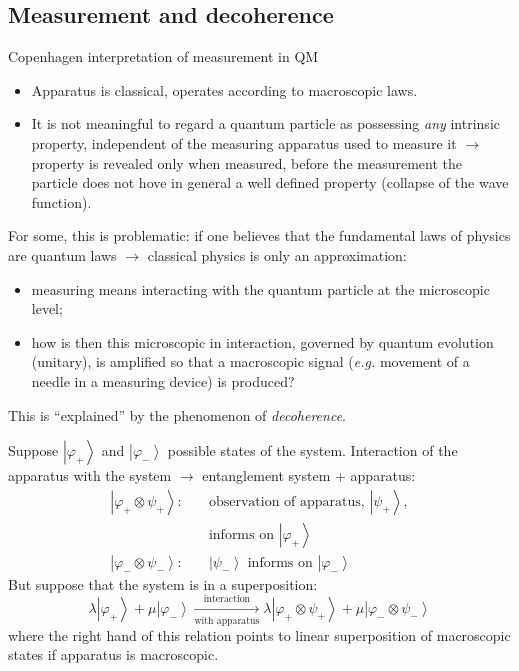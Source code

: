 \documentclass[12pt]{article}
\begin{document}
\subsection{Measurement and decoherence}

Copenhagen interpretation of measurement in QM
\begin{itemize}
\item Apparatus is classical, operates according to
macroscopic laws.
\item It is not meaningful to regard a quantum
particle as possessing \emph{any} intrinsic property,
independent of the measuring apparatus used
to measure it $\rightarrow$ property is revealed only
when measured, before the measurement the
particle does not hove in general a well defined
property (collapse of the wave function).
\end{itemize}


For some, this is problematic: if one believes that
the fundamental laws of physics are quantum laws
$\rightarrow$ classical physics is only an approximation:
\begin{itemize}
\item measuring means interacting with the quantum
particle at the microscopic level;
\item how is then this microscopic in interaction,
governed by quantum evolution (unitary), is
amplified so that a macroscopic signal
(\emph{e.g.} movement of a needle in a measuring
device) is produced?
\end{itemize}
This is ``explained'' by the phenomenon of \emph{decoherence}.

Suppose \(\left|\varphi_{+}\right\rangle\) and \(\left|\varphi_{-}\right\rangle\) possible states of the system.
Interaction of the apparatus with the system \(\rightarrow\) entanglement
system + apparatus:
\[
\begin{aligned}
\left|\varphi_{+} \otimes \psi_{+}\right\rangle:\quad
&\text {observation of apparatus, }\left|\psi_{+}\right\rangle, \\ 
&\text {informs on }\left|\varphi_{+}\right\rangle \\ 
\left|\varphi_{-} \otimes \psi_{-}\right\rangle:\quad 
&\left|\psi_{-}\right\rangle \text { informs on }\left|\varphi_{-}\right\rangle
\end{aligned}
\]
But suppose that the system is in a superposition:
\[
\lambda\left|\varphi_{+}\right\rangle+\mu\left|\varphi_{-}\right\rangle 
\xrightarrow[\text{with apparatus}]{\text{interaction}} 
\lambda\left|\varphi_{+} \otimes \psi_{+}\right\rangle+
\mu\left|\varphi_{-} \otimes \psi_{-}\right\rangle
\]
where the right hand of this relation points to
linear superposition of
macroscopic states if apparatus
is macroscopic.
\end{document}

